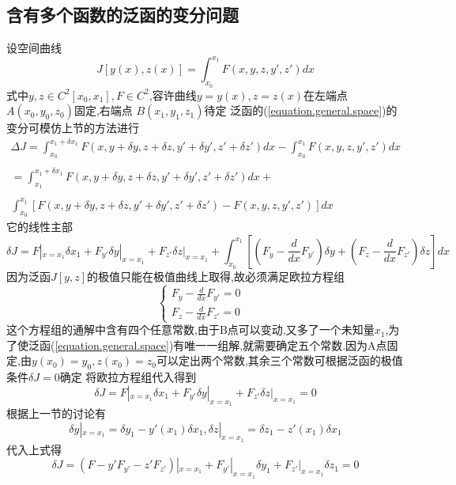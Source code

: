 \documentclass{article}
\begin{document}
\subsection{含有多个函数的泛函的变分问题}
设空间曲线
\begin{equation}
J[y(x),z(x)]=\int_{x_0}^{x_1}F(x,y,z,y',z')dx
\label{equation.general.space}
\end{equation}
式中$y,z \in C^2[x_0,x_1],F \in C^2$,容许曲线$y=y(x),z=z(x)$在左端点
$A(x_0,y_0,z_0)$固定,右端点 $B(x_1,y_1,z_1)$待定
泛函的(\ref{equation.general.space})的变分可模仿上节的方法进行
\begin{equation}
\begin{array}{c}
  \Delta J=\int_{x_0}^{x_1+\delta x_1}F(x,y+\delta y,z+\delta z,y'+\delta y',z'+\delta z')dx-\int_{x_0}^{x_1}F(x,y,z,y',z')dx\\
\\
  = \int_{x_1}^{x_1+\delta x_1}F(x,y+\delta y,z+\delta z,y'+\delta y',z'+\delta z')dx +\\
\\
\int_{x_0}^{x_1}[F(x,y+\delta y,z+\delta z,y'+\delta y',z'+\delta z')-F(x,y,z,y',z')]dx
\end{array}
\end{equation}
它的线性主部
\begin{equation}
 \delta J=F|_{x=x_1}\delta x_1 +F_{y'}\delta y|_{x=x_1} +F_{z'}\delta z|_{x=x_1} +
 \int_{x_0}^{x_1}[(F_y - \frac{d}{dx}F_{y'}) \delta y +(F_z -\frac{d}{dx}F_{z'} )\delta z]dx
\end{equation}
因为泛函$J[y,z]$的极值只能在极值曲线上取得,故必须满足欧拉方程组
$$
\left\{
  \begin{array}{ll}
    F_y - \frac{d}{dx}F_{y'}=0 & \\
    F_z - \frac{d}{dx}F_{z'}=0 &
  \end{array}
\right.
$$
这个方程组的通解中含有四个任意常数,由于B点可以变动,又多了一个未知量$x_1$,为了使泛函(\ref{equation.general.space})有唯一一组解,就需要确定五个常数.因为A点固定,由$y(x_0)=y_0,z(x_0)=z_0$可以定出两个常数,其余三个常数可根据泛函的极值条件$\delta J=0$确定
将欧拉方程组代入得到
\begin{equation}
 \delta J=F|_{x=x_1}\delta x_1 +F_{y'}\delta y|_{x=x_1} +F_{z'}\delta z|_{x=x_1}=0
\end{equation}
根据上一节的讨论有
\begin{equation}
 \delta y|_{x=x_1}=\delta y_1 - y'(x_1)\delta x_1, \delta z|_{x=x_1}=\delta z_1 - z'(x_1)\delta x_1
\end{equation}
代入上式得
\begin{equation}
 \delta J=(F - y'F_{y'} - z'F_{z'})|_{x=x_1} + F_{y'}|_{x=x_1}\delta y_1 + F_{z'}|_{x=x_1}\delta z_1=0
\label{equation.cases}
\end{equation}
\end{document}
